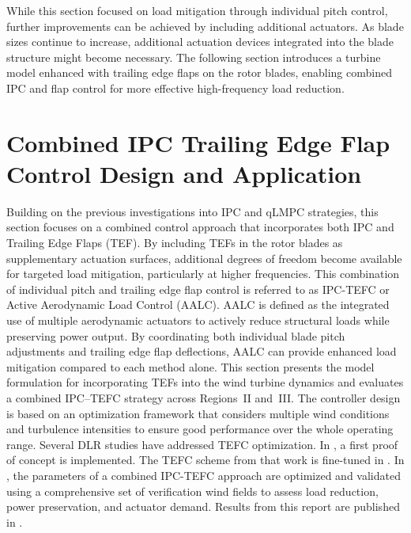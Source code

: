 While this section focused on load mitigation through individual pitch control, further 
improvements can be achieved by including additional actuators. As blade sizes continue to 
increase, additional actuation devices integrated into the blade structure might become 
necessary. The following section introduces a turbine model enhanced 
with trailing edge flaps on the rotor blades, enabling combined IPC and flap control for 
more effective high-frequency load reduction.

\let\oldsectionmark\sectionmark
\renewcommand{\sectionmark}[1]{\oldsectionmark{Combined IPC-TEFC Design and Application}}
\section{Combined IPC Trailing Edge Flap Control Design and Application}
\label{sec:CombinedIPC-TrailingEdgeFlapControl}
\let\sectionmark\oldsectionmark

Building on the previous investigations into IPC and qLMPC strategies, this section focuses on a combined control approach that incorporates both IPC and Trailing Edge Flaps (TEF). By including TEFs in the rotor blades as supplementary actuation surfaces, additional degrees of freedom become available for targeted load mitigation, particularly at higher frequencies. This combination of individual pitch and trailing edge flap control is referred to as IPC-TEFC or Active Aerodynamic Load Control (AALC). AALC is defined as the integrated use of multiple aerodynamic actuators to actively reduce structural loads while preserving power output. By coordinating both individual blade pitch adjustments and trailing edge flap deflections, AALC can provide enhanced load mitigation compared to each method alone. This section presents the model formulation for incorporating TEFs into the wind turbine dynamics and evaluates a combined IPC–TEFC strategy across Regions~II and~III. The controller design is based on an optimization framework that considers multiple wind conditions and turbulence intensities to ensure good performance over the whole operating range. Several DLR studies have addressed TEFC optimization. In \cite{kumar2019load}, a first proof of concept is implemented. The TEFC scheme from that work is fine-tuned in \cite{adolph2022reglerparameteroptimierung}. In \cite{osterwinter2023load}, the parameters of a combined IPC-TEFC approach are optimized and validated using a comprehensive set of verification wind fields to assess load reduction, power preservation, and actuator demand. Results from this report are published in \cite{dittmer2024combined}.


